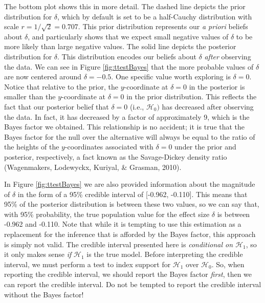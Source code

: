 \documentclass[english,,doc,floatsintext]{apa6}
\begin{document}
The bottom plot shows this in more detail. The dashed line depicts the prior distribution for \(\delta\), which by default is set to be a half-Cauchy distribution with scale \(r=1/\sqrt{2} = 0.707\). This prior distribution represents our \emph{a priori} beliefs about \(\delta\), and particularly shows that we expect small negative values of \(\delta\) to be more likely than large negative values. The solid line depicts the posterior distribution for \(\delta\). This distribution encodes our beliefs about \(\delta\) \emph{after} observing the data. We can see in Figure \ref{fig:ttestBayes} that the more probable values of \(\delta\) are now centered around \(\delta = -0.5\). One specific value worth exploring is \(\delta=0\). Notice that relative to the prior, the \(y\)-coordinate at \(\delta=0\) in the posterior is smaller than the \(y\)-coordinate at \(\delta=0\) in the prior distribution. This reflects the fact that our posterior belief that \(\delta=0\) (i.e., \(\mathcal{H}_0)\) has decreased after observing the data. In fact, it has decreased by a factor of approximately 9, which is the Bayes factor we obtained. This relationship is no accident; it is true that the Bayes factor for the null over the alternative will always be equal to the ratio of the heights of the \(y\)-coordinates associated with \(\delta=0\) under the prior and posterior, respectively, a fact known as the Savage-Dickey density ratio (Wagenmakers, Lodewyckx, Kuriyal, \& Grasman, 2010).

In Figure \ref{fig:ttestBayes} we are also provided information about the magnitude of \(\delta\) in the form of a 95\% credible interval of {[}-0.962, -0.110{]}. This means that 95\% of the posterior distribution is between these two values, so we can say that, with 95\% probability, the true population value for the effect size \(\delta\) is between -0.962 and -0.110. Note that while it is tempting to use this estimation as a replacement for the inference that is afforded by the Bayes factor, this approach is simply not valid. The credible interval presented here is \emph{conditional on \(\mathcal{H}_1\)}, so it only makes sense \emph{if} \(\mathcal{H}_1\) is the true model. Before interpreting the credible interval, we must perform a test to index support for \(\mathcal{H}_1\) over \(\mathcal{H}_0\). So, when reporting the credible interval, we should report the Bayes factor \emph{first}, then we can report the credible interval. Do not be tempted to report the credible interval without the Bayes factor!
\end{document}
